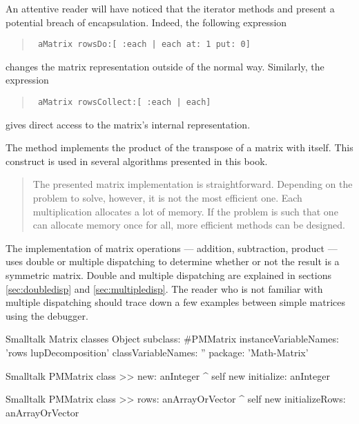 An attentive reader will have noticed that the iterator methods
 and  present a potential breach of
encapsulation. Indeed, the following expression
\begin{quote}
\begin{verbatim}
 aMatrix rowsDo:[ :each | each at: 1 put: 0]
\end{verbatim}
\end{quote}
changes the matrix representation outside of the normal way.
Similarly, the expression
\begin{quote}
\begin{verbatim}
 aMatrix rowsCollect:[ :each | each]
\end{verbatim}
\end{quote}
gives direct access to the matrix's internal representation.

The method  implements the product of the transpose of
a matrix with itself. This construct is used in several algorithms
presented in this book.

\begin{quotation}
 The presented matrix implementation is
straightforward.
Depending on the problem to solve, however, it is not the most efficient one. Each multiplication allocates a lot of
memory.
If the problem is such that one can allocate memory once for all, more efficient methods can be designed.
\end{quotation}

The implementation of matrix operations --- addition, subtraction,
product --- uses double or multiple dispatching to determine
whether or not the result is a symmetric matrix.
Double and multiple dispatching are explained in sections
\ref{sec:doubledisp} and \ref{sec:multipledisp}. The reader who is
not familiar with multiple dispatching should trace down a few
examples between simple matrices using the debugger.

\begin{listing}[label=lst:matrix]{Smalltalk}
{Matrix classes}
Object subclass: #PMMatrix
   instanceVariableNames: 'rows lupDecomposition'
   classVariableNames: ''
   package: 'Math-Matrix'
\end{listing}

\begin{displaycode}{Smalltalk}
PMMatrix class >> new: anInteger
    ^ self new initialize: anInteger
\end{displaycode}

\begin{displaycode}{Smalltalk}
PMMatrix class >> rows: anArrayOrVector
    ^ self new initializeRows: anArrayOrVector
\end{displaycode}

